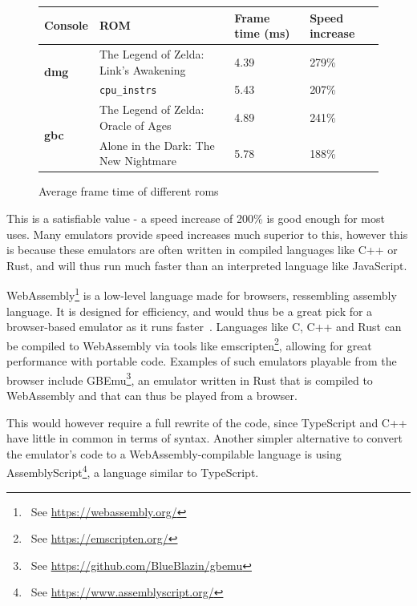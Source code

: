\documentclass[11pt]{report}
\newcommand{\ftnt}[1]{\footnote{~See \url{#1}}}
\begin{document}
\begin{figure}[h]
    \centering
    \begin{tabular}{|l|l|l|l|}
    \hline
    \textbf{Console} & \textbf{ROM} & \textbf{Frame time} (ms) & \textbf{Speed increase} \\ \hline

	\multirow{2}{*}{\textbf{\gls{dmg}}} 
	& The Legend of Zelda: Link's Awakening & 4.39 & 279\% \\\cline{2-4}
	& \texttt{cpu\_instrs} & 5.43 & 207\% \\\hline
	\multirow{2}{*}{\textbf{\gls{gbc}}} 
	& The Legend of Zelda: Oracle of Ages & 4.89 & 241\% \\\cline{2-4}
	& Alone in the Dark: The New Nightmare & 5.78 & 188\% \\\hline
	
    \end{tabular}
    \caption{Average frame time of different \glspl{rom}}
    \label{fig:frame-time-results}
\end{figure}

This is a satisfiable value - a speed increase of 200\% is good enough for most uses. Many emulators provide speed increases much superior to this, however this is because these emulators are often written in compiled languages like C++ or Rust, and will thus run much faster than an interpreted language like JavaScript.

WebAssembly\ftnt{https://webassembly.org/} is a low-level language made for browsers, ressembling assembly language. It is designed for efficiency, and would thus be a great pick for a browser-based emulator as it runs faster~\cite{wasm-faster}. Languages like C, C++ and Rust can be compiled to WebAssembly via tools like emscripten\ftnt{https://emscripten.org/}, allowing for great performance with portable code. Examples of such emulators playable from the browser include GBEmu\ftnt{https://github.com/BlueBlazin/gbemu}, an emulator written in Rust that is compiled to WebAssembly and that can thus be played from a browser.


This would however require a full rewrite of the code, since TypeScript and C++ have little in common in terms of syntax. Another simpler alternative to convert the emulator's code to a WebAssembly-compilable language is using AssemblyScript\ftnt{https://www.assemblyscript.org/}, a language similar to TypeScript.
\end{document}

